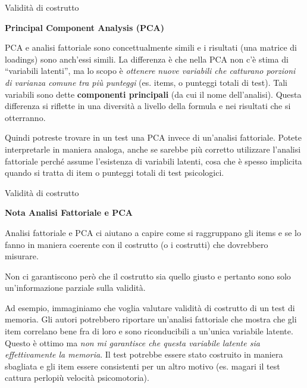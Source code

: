\documentclass[
  ignorenonframetext,
]{beamer}
\begin{document}
\begin{frame}{Validità di costrutto}
\label{validituxe0-di-costrutto-13}
\begin{center}
  \textbf{Principal Component Analysis (PCA)}
\end{center}

\small

PCA e analisi fattoriale sono concettualmente simili e i risultati (una
matrice di loadings) sono anch'essi simili. La differenza è che nella
PCA non c'è stima di ``variabili latenti'', ma lo scopo è \emph{ottenere
nuove variabili che catturano porzioni di varianza comune tra più
punteggi} (es. items, o punteggi totali di test). Tali variabili sono
dette \textbf{componenti principali} (da cui il nome dell'analisi).
Questa differenza si riflette in una diversità a livello della formula e
nei risultati che si otterranno.

Quindi potreste trovare in un test una PCA invece di un'analisi
fattoriale. Potete interpretarle in maniera analoga, anche se sarebbe
più corretto utilizzare l'analisi fattoriale perché assume l'esistenza
di variabili latenti, cosa che è spesso implicita quando si tratta di
item o punteggi totali di test psicologici.
\end{frame}

\begin{frame}{Validità di costrutto}
\label{validituxe0-di-costrutto-14}
\begin{center}
  \textbf{Nota Analisi Fattoriale e PCA}
\end{center}

\small

Analisi fattoriale e PCA ci aiutano a capire come si raggruppano gli
items e se lo fanno in maniera coerente con il costrutto (o i costrutti)
che dovrebbero misurare.

Non ci garantiscono però che il costrutto sia quello giusto e pertanto
sono solo un'informazione parziale sulla validità.

Ad esempio, immaginiamo che voglia valutare validità di costrutto di un
test di memoria. Gli autori potrebbero riportare un'analisi fattoriale
che mostra che gli item correlano bene fra di loro e sono riconducibili
a un'unica variabile latente. Questo è ottimo ma \emph{non mi garantisce
che questa variabile latente sia effettivamente la memoria}. Il test
potrebbe essere stato costruito in maniera sbagliata e gli item essere
consistenti per un altro motivo (es. magari il test cattura perlopiù
velocità psicomotoria).
\end{frame}
\end{document}
